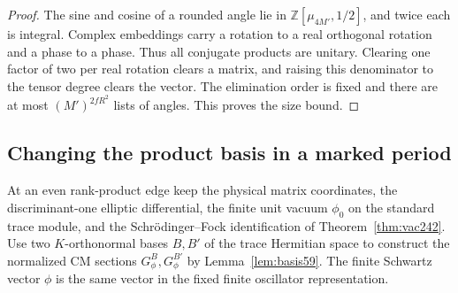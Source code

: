 \documentclass[a4paper,11pt]{article}
\theoremstyle{definition}
\theoremstyle{remark}
\newcommand{\ZZ}{\mathbb Z}\newcommand{\ord}{\operatorname{ord}}
\numberwithin{equation}{section}
\begin{document}
\begin{proof}
The sine and cosine of a rounded angle lie in
\(\ZZ[\mu_{4M'},1/2]\), and twice each is integral. Complex
embeddings carry a rotation to a real orthogonal rotation and
a phase to a phase. Thus all conjugate products are unitary.
Clearing one factor of two per real rotation clears a matrix,
and raising this denominator to the tensor degree clears the
vector. The elimination order is fixed and there are at most
\((M')^{2fR^2}\) lists of angles. This proves the size bound.
\end{proof}

\subsection{Changing the product basis in a marked period}\label{nav:V-60}
At an even rank-product edge keep the physical matrix coordinates,
the discriminant-one elliptic differential, the finite unit vacuum
\(\phi_0\) on the standard trace module, and the
Schr\"odinger--Fock identification of Theorem~\ref{thm:vac242}.
Use two \(K\)-orthonormal bases \(B,B'\) of the trace Hermitian
space to construct the normalized CM sections \(G_\phi^B,G_\phi^{B'}\)
by Lemma~\ref{lem:basis59}. The finite Schwartz vector \(\phi\)
is the same vector in the fixed finite oscillator representation.
\end{document}
